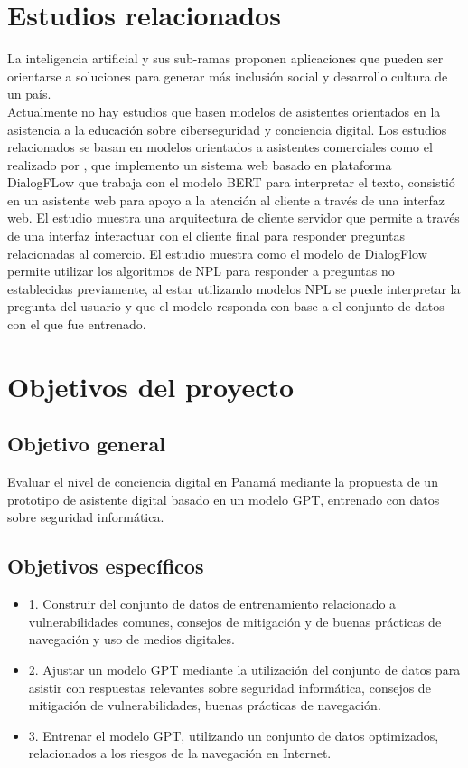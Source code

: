 \section{Estudios relacionados}\label{section: Estudios relacionados}
La inteligencia artificial y sus sub-ramas proponen aplicaciones que pueden ser orientarse a soluciones para generar más inclusión social y desarrollo cultura de un país. \\
Actualmente no hay estudios que basen modelos de asistentes orientados en la asistencia a la educación sobre ciberseguridad y conciencia digital. Los estudios relacionados se basan en modelos orientados a asistentes comerciales como el realizado por \cite{Eleannor2022}, que implemento un sistema web basado en plataforma DialogFLow que trabaja con el modelo BERT para interpretar el texto, consistió en un asistente web para apoyo a la atención al cliente a través de una interfaz web. El estudio muestra una arquitectura de cliente servidor que permite a través de una interfaz interactuar con el cliente final para responder preguntas relacionadas al comercio. El estudio muestra como el modelo de DialogFlow permite utilizar los algoritmos de NPL para responder a preguntas no establecidas previamente, al estar utilizando modelos NPL se puede interpretar la pregunta del usuario y que el modelo responda con base a el conjunto de datos con el que fue entrenado.
\section{Objetivos del proyecto}\label{section:Objetivos del proyecto}
\subsection{Objetivo general}\label{section:Objetivos del proyecto}
Evaluar el nivel de conciencia digital en Panamá mediante la propuesta  de un prototipo de asistente digital basado en un modelo GPT, entrenado con datos sobre seguridad informática.
\subsection{Objetivos específicos}\label{section:Objetivos del proyecto}
 \begin{itemize}
        \item 1.	Construir del conjunto de datos de entrenamiento relacionado a vulnerabilidades comunes, consejos de mitigación y de buenas prácticas de navegación y uso de medios digitales.
        \item 2.	Ajustar un modelo GPT mediante la utilización del conjunto de datos para asistir con respuestas relevantes sobre seguridad informática, consejos de mitigación de vulnerabilidades, buenas prácticas de navegación.
        \item 3.	Entrenar el modelo GPT, utilizando un conjunto de datos optimizados, relacionados a los riesgos de la navegación en Internet. 
    \end{itemize}
    
